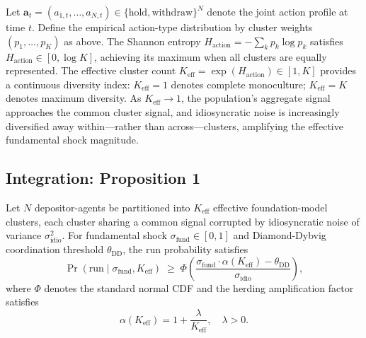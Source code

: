 Let $\mathbf{a}_t = (a_{1,t}, \ldots, a_{N,t}) \in \{\text{hold}, \text{withdraw}\}^N$ denote the joint action profile at time $t$. Define the empirical action-type distribution by cluster weights $(p_1, \ldots, p_K)$ as above. The Shannon entropy $H_{\text{action}} = -\sum_k p_k \log p_k$ satisfies $H_{\text{action}} \in [0, \log K]$, achieving its maximum when all clusters are equally represented. The effective cluster count $K_{\text{eff}} = \exp(H_{\text{action}}) \in [1, K]$ provides a continuous diversity index: $K_{\text{eff}} = 1$ denotes complete monoculture; $K_{\text{eff}} = K$ denotes maximum diversity. As $K_{\text{eff}} \to 1$, the population's aggregate signal approaches the common cluster signal, and idiosyncratic noise is increasingly diversified away within---rather than across---clusters, amplifying the effective fundamental shock magnitude.

\subsection{Integration: Proposition 1}

\begin{proposition}
\label{prop:run-prob}
Let $N$ depositor-agents be partitioned into $K_{\text{eff}}$ effective foundation-model clusters,
each cluster sharing a common signal corrupted by idiosyncratic noise of variance $\sigma_{\text{idio}}^2$.
For fundamental shock $\sigma_{\text{fund}} \in [0, 1]$ and Diamond-Dybvig coordination threshold
$\theta_{\text{DD}}$, the run probability satisfies
\begin{equation}
\Pr(\text{run} \mid \sigma_{\text{fund}}, K_{\text{eff}})
\;\geq\; \Phi\!\left(\frac{\sigma_{\text{fund}} \cdot \alpha(K_{\text{eff}}) - \theta_{\text{DD}}}{\sigma_{\text{idio}}}\right),
\label{eq:prop1}
\end{equation}
where $\Phi$ denotes the standard normal CDF and the herding amplification factor satisfies
\begin{equation}
\alpha(K_{\text{eff}}) = 1 + \frac{\lambda}{K_{\text{eff}}}, \quad \lambda > 0.
\label{eq:alpha}
\end{equation}
\end{proposition}

